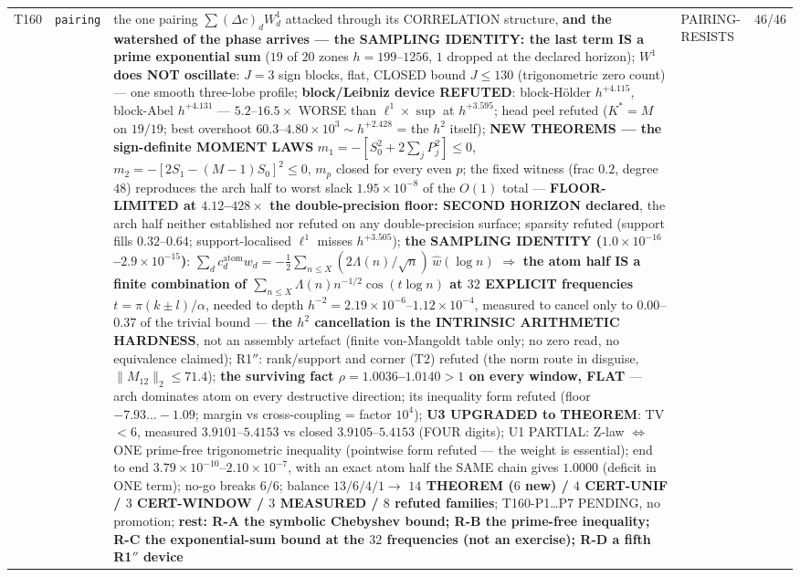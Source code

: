 \documentclass[11pt,a4paper]{article}
\begin{document}
{\begin{xltabular}{\linewidth}{@{}p{0.95cm} >{\raggedright\arraybackslash}p{3.1cm} Y >{\raggedright\scriptsize\arraybackslash}p{3.35cm} p{1.15cm}@{}}
T160 & \texttt{\scriptsize pairing} & the one pairing $\sum(\Delta c)_d W^1_d$ attacked through its CORRELATION structure, \textbf{and the watershed of the phase arrives --- the SAMPLING IDENTITY: the last term IS a prime exponential sum} ($19$ of $20$ zones $h=199$--$1256$, $1$ dropped at the declared horizon); \textbf{$W^1$ does NOT oscillate}: $J=3$ sign blocks, flat, CLOSED bound $J\le130$ (trigonometric zero count) --- one smooth three-lobe profile; \textbf{block/Leibniz device REFUTED}: block-H\"older $h^{+4.115}$, block-Abel $h^{+4.131}$ --- $5.2$--$16.5\times$ WORSE than $\ell^1\times\sup$ at $h^{+3.595}$; head peel refuted ($K^*=M$ on $19/19$; best overshoot $60.3$--$4.80\times10^{3}\sim h^{+2.428}$ = the $h^2$ itself); \textbf{NEW THEOREMS --- the sign-definite MOMENT LAWS} $m_1=-[S_0^2+2\sum_jP_j^2]\le0$, $m_2=-[2S_1-(M-1)S_0]^2\le0$, $m_p$ closed for every even $p$; the fixed witness (frac $0.2$, degree $48$) reproduces the arch half to worst slack $1.95\times10^{-8}$ of the $O(1)$ total --- \textbf{FLOOR-LIMITED at $4.12$--$428\times$ the double-precision floor: SECOND HORIZON declared}, the arch half neither established nor refuted on any double-precision surface; sparsity refuted (support fills $0.32$--$0.64$; support-localised $\ell^1$ misses $h^{+3.505}$); \textbf{the SAMPLING IDENTITY ($1.0\times10^{-16}$--$2.9\times10^{-15}$)}: $\sum_dc^{\mathrm{atom}}_dw_d=-\tfrac12\sum_{n\le X}(2\Lambda(n)/\sqrt n)\,\widehat w(\log n)$ $\Rightarrow$ \textbf{the atom half IS a finite combination of $\sum_{n\le X}\Lambda(n)n^{-1/2}\cos(t\log n)$ at $32$ EXPLICIT frequencies $t=\pi(k\pm l)/\alpha$}, needed to depth $h^{-2}=2.19\times10^{-6}$--$1.12\times10^{-4}$, measured to cancel only to $0.00$--$0.37$ of the trivial bound --- \textbf{the $h^2$ cancellation is the INTRINSIC ARITHMETIC HARDNESS}, not an assembly artefact (finite von-Mangoldt table only; no zero read, no equivalence claimed); R1$''$: rank/support and corner (T2) refuted (the norm route in disguise, $\|M_{12}\|_2\le71.4$); \textbf{the surviving fact $\rho=1.0036$--$1.0140>1$ on every window, FLAT} --- arch dominates atom on every destructive direction; its inequality form refuted (floor $-7.93\ldots-1.09$; margin vs cross-coupling = factor $10^4$); \textbf{U3 UPGRADED to THEOREM}: TV $<6$, measured $3.9101$--$5.4153$ vs closed $3.9105$--$5.4153$ (FOUR digits); U1 PARTIAL: Z-law $\Leftrightarrow$ ONE prime-free trigonometric inequality (pointwise form refuted --- the weight is essential); end to end $3.79\times10^{-10}$--$2.10\times10^{-7}$, with an exact atom half the SAME chain gives $1.0000$ (deficit in ONE term); no-go breaks $6/6$; balance $13/6/4/1\to$ \textbf{$14$ THEOREM ($6$ new) / $4$ CERT-UNIF / $3$ CERT-WINDOW / $3$ MEASURED / $8$ refuted families}; T160-P1\ldots P7 PENDING, no promotion; \textbf{rest: R-A the symbolic Chebyshev bound; R-B the prime-free inequality; R-C the exponential-sum bound at the $32$ frequencies (not an exercise); R-D a fifth R1$''$ device} & PAIRING-RESISTS & 46/46\\

\end{xltabular}}
\end{document}
